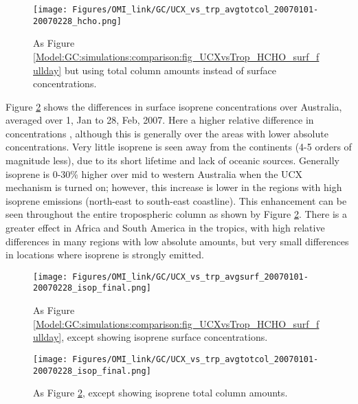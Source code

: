       \begin{figure}
        \texttt{[image: Figures/OMI\_link/GC/UCX\_vs\_trp\_avgtotcol\_20070101-20070228\_hcho.png]}
        \caption{%
          As Figure \ref{Model:GC:simulations:comparison:fig_UCXvsTrop_HCHO_surf_fullday} but using total column amounts instead of surface concentrations.
        }
        \label{Model:GC:simulations:comparison:fig_UCXvsTrop_HCHO_totcol_fullday}
      \end{figure}
      
      
      Figure \ref{Model:GC:simulations:comparison:fig_UCXvsTrop_isop_surf_fullday} shows the differences in surface isoprene concentrations over Australia, averaged over 1, Jan to 28, Feb, 2007.
      Here a higher relative difference in concentrations , although this is generally over the areas with lower absolute concentrations. 
      Very little isoprene is seen away from the continents (4-5 orders of magnitude less), due to its short lifetime and  lack of oceanic sources.
      Generally isoprene is 0-30\% higher over mid to western Australia when the UCX mechanism is turned on; however, this increase is lower in the regions with high isoprene emissions (north-east to south-east coastline).
      This enhancement can be seen throughout the entire tropospheric column as shown by Figure \ref{Model:GC:simulations:comparison:fig_UCXvsTrop_isop_surf_fullday}.
      There is a greater effect in Africa and South America in the tropics, with high relative differences in many regions with low absolute amounts, but very small differences in locations where isoprene is strongly emitted.
      
      \begin{figure}
        \texttt{[image: Figures/OMI\_link/GC/UCX\_vs\_trp\_avgsurf\_20070101-20070228\_isop\_final.png]}
        \caption{ %
          As Figure \ref{Model:GC:simulations:comparison:fig_UCXvsTrop_HCHO_surf_fullday}, except showing isoprene surface concentrations. 
        }      
        \label{Model:GC:simulations:comparison:fig_UCXvsTrop_isop_surf_fullday}
      \end{figure}
      \begin{figure}
        \texttt{[image: Figures/OMI\_link/GC/UCX\_vs\_trp\_avgtotcol\_20070101-20070228\_isop\_final.png]}
        \caption{ %
          As Figure \ref{Model:GC:simulations:comparison:fig_UCXvsTrop_isop_surf_fullday}, except showing isoprene total column amounts. 
        }      
        \label{Model:GC:simulations:comparison:fig_UCXvsTrop_isop_totcol_fullday}
      \end{figure}
      

